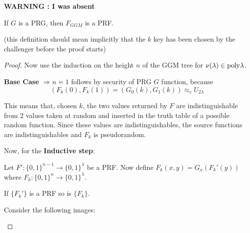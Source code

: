 \textbf{WARNING : I was absent} 
\begin{theorem}
    If $G$ is a PRG, then $F_{GGM}$ is a PRF.
\end{theorem}
(this definition should mean implicitly that the $k$ key has been chosen by the
challenger before the proof starts)

\begin{proof} 
    Now use the induction on the height $n$ of the GGM tree for $\nu(\lambda)
    \in \mathrm{poly}{\lambda} $.
    
    \textbf{Base Case $\Rightarrow n=1$} follows by security of PRG $G$ function, because
    \begin{equation*}
        (F_{k}(0), F_{k}(1))=(G_{0}(k), G_{1}(k)) \approx_{c} U_{2\lambda}
    \end{equation*}

    This means that, chosen $k$, the two values returned by $F$ are
    indistinguishable from 2 values taken at random and inserted in the
    truth table of a possible random function. Since these values are
    indistinguishables, the source functions are indistinguishables and $F_{k}$
    is pseudorandom.
    
    Now, for the \textbf{Inductive step}:

    \begin{lemma}
       Let $F':\{0,1\}^{n-1} \to \{0,1\}^{\lambda} $ be a PRF.
       Now define $F_{k}(x,y)=G_{x}(F_{k}'(y))$ where $F_{k}:\{0,1\}^{n} \to
       \{0,1\}^{\lambda} $.

       If $\{F_{k}'\}$ is a PRF so is $ \{F_{k}\}$.
    \end{lemma}
    
    Consider the following images:

    
    \newpage
    \begin{figure}[h!]
       \centering
       \sdinit{}
\end{figure}
\end{proof}
